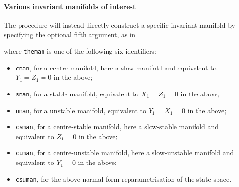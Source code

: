 \paragraph{Various invariant manifolds of interest}
The procedure will instead directly construct a specific invariant manifold by specifying the optional fifth argument, as in
where \verb|theman| is one of the following six identifiers:
\begin{itemize}
\item \verb|cman|, for a centre manifold, here a slow manifold and equivalent to \(Y_1=Z_1=0\) in the above;
\item \verb|sman|, for a stable manifold, equivalent to \(X_1=Z_1=0\) in the above;
\item \verb|uman|, for a unstable manifold, equivalent to \(Y_1=X_1=0\) in the above;
\item \verb|csman|, for a centre-stable manifold, here a slow-stable manifold and equivalent to \(Z_1=0\) in the above;
\item \verb|cuman|, for a centre-unstable manifold, here a slow-unstable manifold and equivalent to \(Y_1=0\) in the above;
\item \verb|csuman|, for the above normal form reparametrisation of the state space.
\end{itemize}

